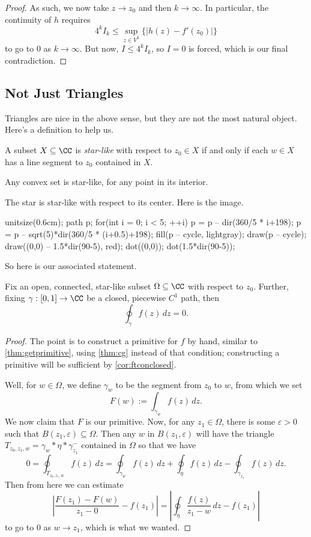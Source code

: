 \begin{proof}
	As such, we now take $z\to z_0$ and then $k\to\infty$. In particular, the continuity of $h$ requires
	\[4^kI_k\le\sup_{z\in V^k}\{|h(z)-f'(z_0)|\}\]
	to go to $0$ as $k\to\infty$. But now, $I\le 4^kI_k$, so $I=0$ is forced, which is our final contradiction.
\end{proof}

\subsection{Not Just Triangles}
Triangles are nice in the above sense, but they are not the most natural object. Here's a definition to help us.
\begin{definition}
	A subset $X\subseteq\CC$ is \textit{star-like} with respect to $z_0\in X$ if and only if each $w\in X$ has a line segment to $z_0$ contained in $X$.
\end{definition}
\begin{example}
	Any convex set is star-like, for any point in its interior.
\end{example}
\begin{ex}
	The star is star-like with respect to its center. Here is the image.
	\begin{center}
		\begin{asy}
			unitsize(0.6cm);
			path p;
			for(int i = 0; i < 5; ++i)
			{
				p = p -- dir(360/5 * i+198);
				p = p -- sqrt(5)*dir(360/5 * (i+0.5)+198);
			}
			fill(p -- cycle, lightgray);
			draw(p -- cycle);
			draw((0,0) -- 1.5*dir(90-5), red);
			dot((0,0));
			dot(1.5*dir(90-5));
		\end{asy}
	\end{center}
\end{ex}
So here is our associated statement.
\begin{theorem}
	Fix an open, connected, star-like subset $\Omega\subseteq\CC$ with respect to $z_0$. Further, fixing $\gamma:[0,1]\to\CC$ be a closed, piecewise $C^1$ path, then
	\[\oint_\gamma f(z)\,dz=0.\]
\end{theorem}
\begin{proof}
	The point is to construct a primitive for $f$ by hand, similar to \autoref{thm:getprimitive}, using \autoref{thm:cg} instead of that condition; constructing a primitive will be sufficient by \autoref{cor:ftconclosed}.
	
	Well, for $w\in\Omega$, we define $\gamma_w$ to be the segment from $z_0$ to $w$, from which we set
	\[F(w):=\int_{\gamma_w}f(z)\,dz.\]
	We now claim that $F$ is our primitive. Now, for any $z_1\in\Omega$, there is some $\varepsilon>0$ such that $B(z_1,\varepsilon)\subseteq\Omega$. Then any $w$ in $B(z_1,\varepsilon)$ will have the triangle $T_{z_0,z_1,w}=\gamma_w*\eta*\gamma_{z_1}^-$ contained in $\Omega$ %
	so that we have
	\[0=\oint_{T_{z_0,z_1,w}}f(z)\,dz=\oint_{\gamma_w}f(z)\,dz+\oint_\eta f(z)\,dz-\oint_{\gamma_{z_1}}f(z)\,dz.\]
	Then from here we can estimate
	\[\left|\frac{F(z_1)-F(w)}{z_1-0}-f(z_1)\right|=\left|\oint_\eta\frac{f(z)}{z_1-w}\,dz-f(z_1)\right|\]
	to go to $0$ as $w\to z_1$, which is what we wanted.
\end{proof}